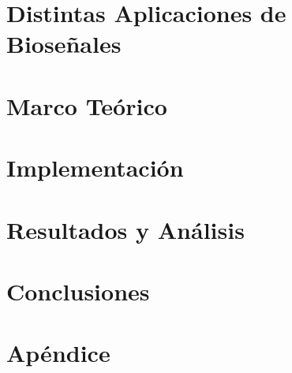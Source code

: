 \documentclass[a4paper]{report}
\begin{document}
\chapter{Distintas Aplicaciones de Bioseñales} \label{chap:biosignal-apps}


\chapter{Marco Teórico}


\chapter{Implementación}


\chapter{Resultados y Análisis}



\chapter{Conclusiones}


\appendix
\chapter{Apéndice}

\printglossary[type=\acronymtype,title={Lista de Acrónimos}]

{}

\end{document}
